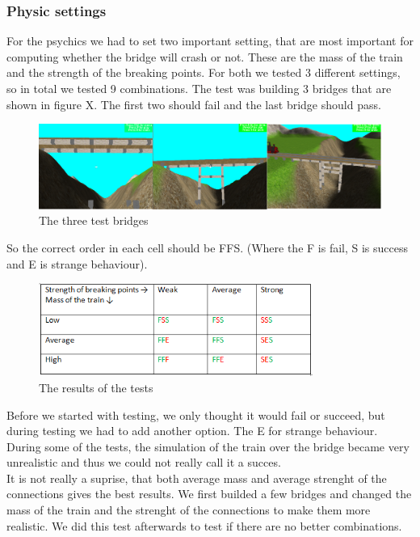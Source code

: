 \subsubsection{Physic settings}
For the psychics we had to set two important setting, that are most important for computing whether the bridge will crash or not. These are the mass of the train and the strength of the breaking points. For both we tested 3 different settings, so in total we tested 9 combinations. The test was building 3 bridges that are shown in figure X. The first two should fail and the last bridge should pass. \\
\begin{figure}[H]
    \centering
    \includegraphics[width=1.0\textwidth]{screenshots/bridges.png}
    \caption{The three test bridges}
    \label{fig:bridges}
\end{figure}
So the correct order in each cell should be FFS. (Where the F is fail, S is success and E is strange behaviour). \\
\begin{figure}[H]
    \centering
    \includegraphics[width=0.8\textwidth]{screenshots/table.png}
    \caption{The results of the tests}
    \label{fig:table}
\end{figure}
Before we started with testing, we only thought it would fail or succeed, but during testing we had to add another option. The E for strange behaviour. During some of the tests, the simulation of the train over the bridge became very unrealistic and thus we could not really call it a succes. \\
It is not really a suprise, that both average mass and average strenght of the connections gives the best results. We first builded a few bridges and changed the mass of the train and the strenght of the connections to make them more realistic. We did this test afterwards to test if there are no better combinations. \\
